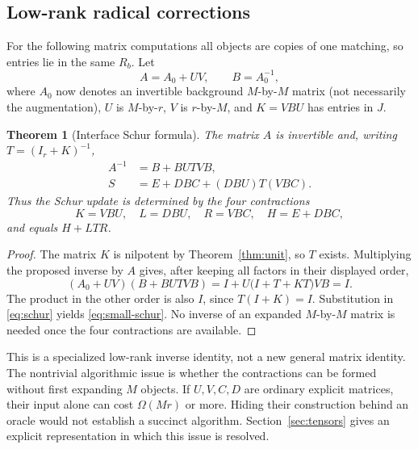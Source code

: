\documentclass[11pt]{article}
\newtheorem{theorem}{Theorem}[section]
\theoremstyle{definition}\newtheorem{definition}[theorem]{Definition}
\theoremstyle{remark}\newtheorem{remark}[theorem]{Remark}
\begin{document}
\subsection{Low-rank radical corrections}
For the following matrix computations all objects are copies of one matching, so entries lie in the same $R_b$. Let
\[
 A=A_0+UV,\qquad B=A_0^{-1},
\]
where $A_0$ now denotes an invertible background $M$-by-$M$ matrix (not necessarily the augmentation), $U$ is $M$-by-$r$, $V$ is $r$-by-$M$, and $K=VBU$ has entries in $J$.

\begin{theorem}[Interface Schur formula]\label{thm:woodbury}
The matrix $A$ is invertible and, writing $T=(I_r+K)^{-1}$,
\begin{align}
 A^{-1}&=B+BUTVB,\label{eq:woodbury}\\
 S&=E+DBC+(DBU)T(VBC).\label{eq:small-schur}
\end{align}
Thus the Schur update is determined by the four contractions
\begin{equation}\label{eq:four}
 K=VBU,\quad L=DBU,\quad R=VBC,\quad H=E+DBC,
\end{equation}
and equals $H+LTR$.
\end{theorem}
\begin{proof}
The matrix $K$ is nilpotent by Theorem~\ref{thm:unit}, so $T$ exists. Multiplying the proposed inverse by $A$ gives, after keeping all factors in their displayed order,
\[
 (A_0+UV)(B+BUTVB)
 =I+U\bigl(I+T+KT\bigr)VB=I.
\]
The product in the other order is also $I$, since $T(I+K)=I$. Substitution in \eqref{eq:schur} yields \eqref{eq:small-schur}. No inverse of an expanded $M$-by-$M$ matrix is needed once the four contractions are available.
\end{proof}

This is a specialized low-rank inverse identity, not a new general matrix identity. The nontrivial algorithmic issue is whether the contractions can be formed without first expanding $M$ objects. If $U,V,C,D$ are ordinary explicit matrices, their input alone can cost $\Omega(Mr)$ or more. Hiding their construction behind an oracle would not establish a succinct algorithm. Section~\ref{sec:tensors} gives an explicit representation in which this issue is resolved.
\end{document}

